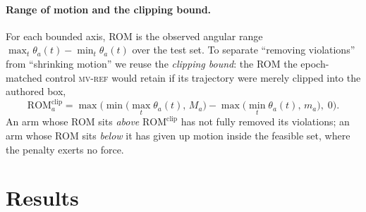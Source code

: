 \documentclass[11pt,a4paper]{article}
\newcommand{\armref}{\textsc{mv-ref}}
\begin{document}
\paragraph{Range of motion and the clipping bound.}
For each bounded axis, ROM is the observed angular range
$\max_t \theta_a(t) - \min_t \theta_a(t)$ over the test set. To separate
``removing violations'' from ``shrinking motion'' we reuse the \emph{clipping
bound}: the ROM the epoch-matched control \armref{} would retain if its
trajectory were merely clipped into the authored box,
\begin{equation}
  \mathrm{ROM}^{\text{clip}}_a
  = \max\!\Big(
      \min\big(\max_t \theta_a(t),\, M_a\big)
      - \max\big(\min_t \theta_a(t),\, m_a\big),
      \; 0
    \Big).
  \label{eq:clip}
\end{equation}
An arm whose ROM sits \emph{above} $\mathrm{ROM}^{\text{clip}}$ has not fully
removed its violations; an arm whose ROM sits \emph{below} it has given up
motion inside the feasible set, where the penalty exerts no force.

\section{Results}
\label{sec:results}
\end{document}
